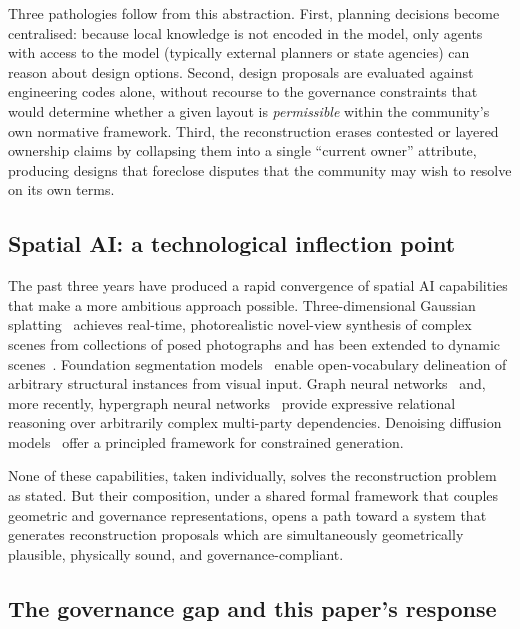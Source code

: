 \documentclass[11pt,a4paper]{article}
\theoremstyle{plain}
\theoremstyle{definition}
\theoremstyle{remark}
\begin{document}
Three pathologies follow from this abstraction. First, planning decisions
become centralised: because local knowledge is not encoded in the model,
only agents with access to the model (typically external planners or
state agencies) can reason about design options. Second, design proposals
are evaluated against engineering codes alone, without recourse to the
governance constraints that would determine whether a given layout is
\emph{permissible} within the community's own normative framework. Third,
the reconstruction erases contested or layered ownership claims by
collapsing them into a single ``current owner'' attribute, producing
designs that foreclose disputes that the community may wish to resolve on
its own terms.

\subsection{Spatial AI: a technological inflection point}

The past three years have produced a rapid convergence of spatial AI
capabilities that make a more ambitious approach possible. Three-dimensional
Gaussian splatting~\cite{kerbl2023gaussian} achieves real-time,
photorealistic novel-view synthesis of complex scenes from collections of
posed photographs and has been extended to dynamic
scenes~\cite{wu2024_4dgs, yang2024deformable}. Foundation segmentation
models~\cite{kirillov2023sam} enable open-vocabulary delineation of
arbitrary structural instances from visual input. Graph neural
networks~\cite{hamilton2017inductive, schlichtkrull2018modeling} and,
more recently, hypergraph neural networks~\cite{feng2019hgnn,
chien2022allset} provide expressive relational reasoning over arbitrarily
complex multi-party dependencies. Denoising diffusion
models~\cite{ho2020ddpm, song2021score} offer a principled framework for
constrained generation.

None of these capabilities, taken individually, solves the reconstruction
problem as stated. But their composition, under a shared formal framework
that couples geometric and governance representations, opens a path
toward a system that generates reconstruction proposals which are
simultaneously geometrically plausible, physically sound, and
governance-compliant.

\subsection{The governance gap and this paper's response}
\end{document}
